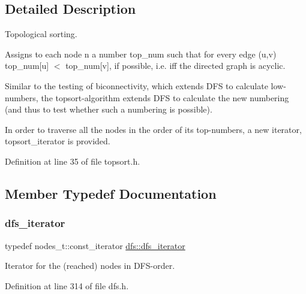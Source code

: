 \subsection{Detailed Description}
Topological sorting. 

Assigns to each node {\ttfamily n} a number {\ttfamily top\+\_\+num} such that for every edge {\ttfamily (u,v)} {\ttfamily top\+\_\+num\mbox{[}u\mbox{]}} $<$ {\ttfamily top\+\_\+num\mbox{[}v\mbox{]}}, if possible, i.\+e. iff the directed graph is acyclic. ~\newline
 

Similar to the testing of biconnectivity, which extends D\+FS to calculate low-\/numbers, the topsort-\/algorithm extends D\+FS to calculate the new numbering (and thus to test whether such a numbering is possible).

In order to traverse all the nodes in the order of its top-\/numbers, a new iterator, {\ttfamily topsort\+\_\+iterator} is provided. 

Definition at line 35 of file topsort.\+h.



\subsection{Member Typedef Documentation}
\mbox{\label{classdfs_a15fe023a5a1f7ddda00f3d87110d9a32}} 
\subsubsection{\texorpdfstring{dfs\+\_\+iterator}{dfs\_iterator}}
{\footnotesize\ttfamily typedef nodes\+\_\+t\+::const\+\_\+iterator \mbox{\hyperlink{classdfs_a15fe023a5a1f7ddda00f3d87110d9a32}{dfs\+::dfs\+\_\+iterator}}\hspace{0.3cm}{\ttfamily [inherited]}}



Iterator for the (reached) nodes in D\+F\+S-\/order. 



Definition at line 314 of file dfs.\+h.

\mbox{\label{classdfs_a95e353f354d3b31daded0c4fe749171a}} 

